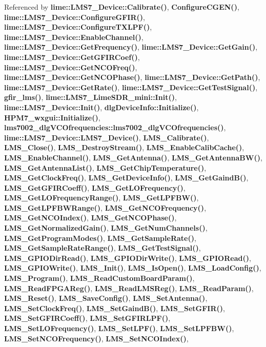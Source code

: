 Referenced by {\bf lime\+::\+L\+M\+S7\+\_\+\+Device\+::\+Calibrate()}, {\bf Configure\+C\+G\+E\+N()}, {\bf lime\+::\+L\+M\+S7\+\_\+\+Device\+::\+Configure\+G\+F\+I\+R()}, {\bf lime\+::\+L\+M\+S7\+\_\+\+Device\+::\+Configure\+T\+X\+L\+P\+F()}, {\bf lime\+::\+L\+M\+S7\+\_\+\+Device\+::\+Enable\+Channel()}, {\bf lime\+::\+L\+M\+S7\+\_\+\+Device\+::\+Get\+Frequency()}, {\bf lime\+::\+L\+M\+S7\+\_\+\+Device\+::\+Get\+Gain()}, {\bf lime\+::\+L\+M\+S7\+\_\+\+Device\+::\+Get\+G\+F\+I\+R\+Coef()}, {\bf lime\+::\+L\+M\+S7\+\_\+\+Device\+::\+Get\+N\+C\+O\+Freq()}, {\bf lime\+::\+L\+M\+S7\+\_\+\+Device\+::\+Get\+N\+C\+O\+Phase()}, {\bf lime\+::\+L\+M\+S7\+\_\+\+Device\+::\+Get\+Path()}, {\bf lime\+::\+L\+M\+S7\+\_\+\+Device\+::\+Get\+Rate()}, {\bf lime\+::\+L\+M\+S7\+\_\+\+Device\+::\+Get\+Test\+Signal()}, {\bf gfir\+\_\+lms()}, {\bf lime\+::\+L\+M\+S7\+\_\+\+Lime\+S\+D\+R\+\_\+mini\+::\+Init()}, {\bf lime\+::\+L\+M\+S7\+\_\+\+Device\+::\+Init()}, {\bf dlg\+Device\+Info\+::\+Initialize()}, {\bf H\+P\+M7\+\_\+wxgui\+::\+Initialize()}, {\bf lms7002\+\_\+dlg\+V\+C\+Ofrequencies\+::lms7002\+\_\+dlg\+V\+C\+Ofrequencies()}, {\bf lime\+::\+L\+M\+S7\+\_\+\+Device\+::\+L\+M\+S7\+\_\+\+Device()}, {\bf L\+M\+S\+\_\+\+Calibrate()}, {\bf L\+M\+S\+\_\+\+Close()}, {\bf L\+M\+S\+\_\+\+Destroy\+Stream()}, {\bf L\+M\+S\+\_\+\+Enable\+Calib\+Cache()}, {\bf L\+M\+S\+\_\+\+Enable\+Channel()}, {\bf L\+M\+S\+\_\+\+Get\+Antenna()}, {\bf L\+M\+S\+\_\+\+Get\+Antenna\+B\+W()}, {\bf L\+M\+S\+\_\+\+Get\+Antenna\+List()}, {\bf L\+M\+S\+\_\+\+Get\+Chip\+Temperature()}, {\bf L\+M\+S\+\_\+\+Get\+Clock\+Freq()}, {\bf L\+M\+S\+\_\+\+Get\+Device\+Info()}, {\bf L\+M\+S\+\_\+\+Get\+Gaind\+B()}, {\bf L\+M\+S\+\_\+\+Get\+G\+F\+I\+R\+Coeff()}, {\bf L\+M\+S\+\_\+\+Get\+L\+O\+Frequency()}, {\bf L\+M\+S\+\_\+\+Get\+L\+O\+Frequency\+Range()}, {\bf L\+M\+S\+\_\+\+Get\+L\+P\+F\+B\+W()}, {\bf L\+M\+S\+\_\+\+Get\+L\+P\+F\+B\+W\+Range()}, {\bf L\+M\+S\+\_\+\+Get\+N\+C\+O\+Frequency()}, {\bf L\+M\+S\+\_\+\+Get\+N\+C\+O\+Index()}, {\bf L\+M\+S\+\_\+\+Get\+N\+C\+O\+Phase()}, {\bf L\+M\+S\+\_\+\+Get\+Normalized\+Gain()}, {\bf L\+M\+S\+\_\+\+Get\+Num\+Channels()}, {\bf L\+M\+S\+\_\+\+Get\+Program\+Modes()}, {\bf L\+M\+S\+\_\+\+Get\+Sample\+Rate()}, {\bf L\+M\+S\+\_\+\+Get\+Sample\+Rate\+Range()}, {\bf L\+M\+S\+\_\+\+Get\+Test\+Signal()}, {\bf L\+M\+S\+\_\+\+G\+P\+I\+O\+Dir\+Read()}, {\bf L\+M\+S\+\_\+\+G\+P\+I\+O\+Dir\+Write()}, {\bf L\+M\+S\+\_\+\+G\+P\+I\+O\+Read()}, {\bf L\+M\+S\+\_\+\+G\+P\+I\+O\+Write()}, {\bf L\+M\+S\+\_\+\+Init()}, {\bf L\+M\+S\+\_\+\+Is\+Open()}, {\bf L\+M\+S\+\_\+\+Load\+Config()}, {\bf L\+M\+S\+\_\+\+Program()}, {\bf L\+M\+S\+\_\+\+Read\+Custom\+Board\+Param()}, {\bf L\+M\+S\+\_\+\+Read\+F\+P\+G\+A\+Reg()}, {\bf L\+M\+S\+\_\+\+Read\+L\+M\+S\+Reg()}, {\bf L\+M\+S\+\_\+\+Read\+Param()}, {\bf L\+M\+S\+\_\+\+Reset()}, {\bf L\+M\+S\+\_\+\+Save\+Config()}, {\bf L\+M\+S\+\_\+\+Set\+Antenna()}, {\bf L\+M\+S\+\_\+\+Set\+Clock\+Freq()}, {\bf L\+M\+S\+\_\+\+Set\+Gaind\+B()}, {\bf L\+M\+S\+\_\+\+Set\+G\+F\+I\+R()}, {\bf L\+M\+S\+\_\+\+Set\+G\+F\+I\+R\+Coeff()}, {\bf L\+M\+S\+\_\+\+Set\+G\+F\+I\+R\+L\+P\+F()}, {\bf L\+M\+S\+\_\+\+Set\+L\+O\+Frequency()}, {\bf L\+M\+S\+\_\+\+Set\+L\+P\+F()}, {\bf L\+M\+S\+\_\+\+Set\+L\+P\+F\+B\+W()}, {\bf L\+M\+S\+\_\+\+Set\+N\+C\+O\+Frequency()}, {\bf L\+M\+S\+\_\+\+Set\+N\+C\+O\+Index()}, 